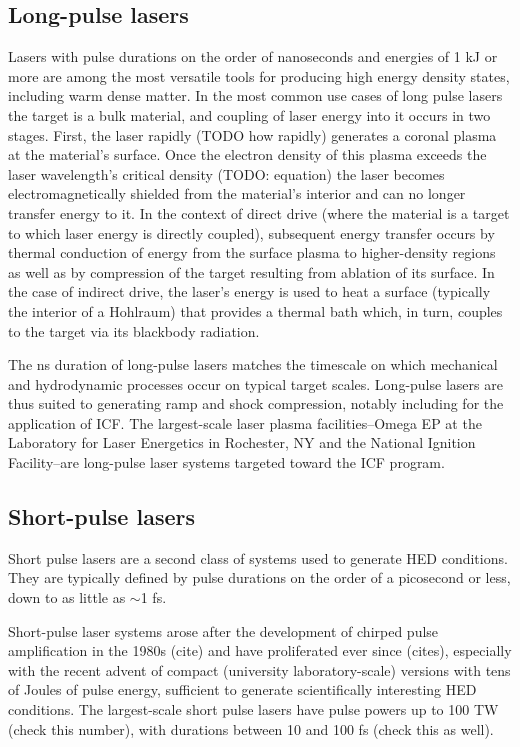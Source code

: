 \subsection{Long-pulse lasers}
Lasers with pulse durations on the order of nanoseconds and energies of 1 kJ or more are among the most versatile tools for producing high energy density states, including warm dense matter. In the most common use cases of long pulse lasers the target is a bulk material, and coupling of laser energy into it occurs in two stages. First, the laser rapidly (TODO how rapidly) generates a coronal plasma at the material's surface. Once the electron density of this plasma exceeds the laser wavelength's critical density (TODO: equation) the laser becomes electromagnetically shielded from the material's interior and can no longer transfer energy to it. In the context of direct drive (where the material is a target to which laser energy is directly coupled), subsequent energy transfer occurs by thermal conduction of energy from the surface plasma to higher-density regions as well as by compression of the target resulting from ablation of its surface. In the case of indirect drive, the laser's energy is used to heat a surface (typically the interior of a Hohlraum) that provides a thermal bath which, in turn, couples to the target via its blackbody radiation. 

The ns duration of long-pulse lasers matches the timescale on which mechanical and hydrodynamic processes occur on typical target scales. Long-pulse lasers are thus suited to generating ramp and shock compression, notably including for the application of ICF. The largest-scale laser plasma facilities--Omega EP at the Laboratory for Laser Energetics in Rochester, NY and the National Ignition Facility--are long-pulse laser systems targeted toward the ICF program.


\subsection{Short-pulse lasers}
Short pulse lasers are a second class of systems used to generate HED conditions. They are typically defined by pulse durations on the order of a picosecond or less, down to as little as $\sim$1 fs. 

Short-pulse laser systems arose after the development of chirped pulse amplification in the 1980s (cite) and have proliferated ever since (cites), especially with the recent advent of compact (university laboratory-scale) versions with tens of Joules of pulse energy, sufficient to generate scientifically interesting HED conditions. The largest-scale short pulse lasers have pulse powers up to 100 TW (check this number), with durations between 10 and 100 fs (check this as well).


